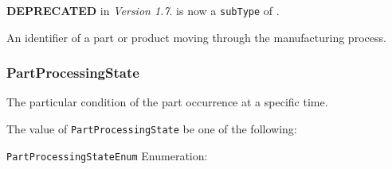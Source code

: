 \textbf{DEPRECATED} in \textit{Version 1.7}.  is now a \texttt{subType} of
.

An identifier of a part or product moving through the manufacturing process.



\subsubsection{PartProcessingState}
\label{sec:PartProcessingState}



The particular condition of the part occurrence at a specific time.


The value of \texttt{PartProcessingState} \MUST be one of the following: 


\texttt{PartProcessingStateEnum} Enumeration:

